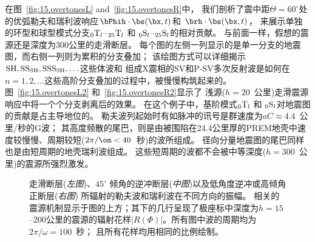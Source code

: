 在图~\ref{fig:15.overtonesL} and~\ref{fig:15.overtonesR}中，
我们剖析了震中距$\Theta=60^{\circ}$处的优弧勒夫和瑞利波响应$\bPhih\cdot\bs(\bx,t)$和 $\brh\cdot\bs(\bx,t)$，
来展示单独的环型和球型模式分支${}_0{\rm T}_l$\hspace{0.3 mm}--\hspace{0.3 mm}${}_{25}{\rm T}_l$
和 ${}_0{\rm S}_l$\hspace{0.3 mm}--\hspace{0.3 mm}${}_{25}{\rm S}_l$的相对贡献。
与前面一样，假想的震源还是深度为300公里的走滑断层。
每个图的左侧一列显示的是单一分支的地震图，而右侧一列则为累积的分支叠加；
该绘图方式可以详细揭示${\rm SH},{\rm SS}_{\rm SH},{\rm SSS}_{\rm SH},\ldots$这些体波和
组成X震相的SV和P-SV多次反射波是如何在$n=1,2,\ldots$这些高阶分支叠加的过程中，被慢慢构筑起来的。
图~\ref{fig:15.overtonesL2} 和~\ref{fig:15.overtonesR2}显示了
浅源($h=20$~公里)走滑震源响应中将一个个分支剥离后的效果。
在这个例子中，基阶模式${}_0{\rm T}_l$ 和 ${}_0{\rm S}_l$对地震图的贡献是占主导地位的。
勒夫波列起始时有如脉冲的讯号是群速度为$aC\approx 4.4$~公里/秒的G波；
其高度频散的尾巴，则是由被围陷在24.4公里厚的PREM地壳中速度较慢慢、周期较短($2\pi/\om<40$~秒)的波所组成。
径向分量地震图的尾巴同样也是由短周期的地壳瑞利波组成。
这些短周期的波都不会被中等深度($h=300$~公里)的震源所强烈激发。
%
%

\begin{figure}[!b]
\begin{center}
\end{center}
\caption[L&R rad pats]{
\label{fig:11.8}
走滑断层({\em 左图\/})、$45^{\circ}$ 倾角的逆冲断层({\em 中图\/})以及低角度逆冲或高倾角正断层({\em 右图\/})
所辐射的勒夫波和瑞利波在不同方向的振幅。
相关的震源机制显示于图的上方；其下的几行呈现了极座标中深度为$h=15$--200公里的震源的辐射花样$|R(\Phi)|$。所有图中波的周期均为$2\pi/\omega=100$~秒；
且所有花样均用相同的比例绘制。}
\end{figure}



